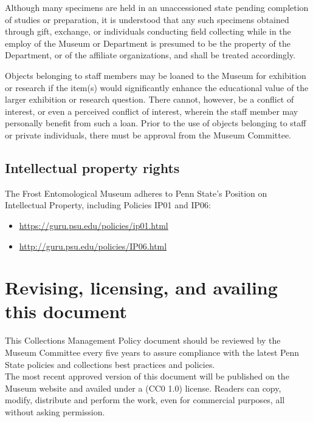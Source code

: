 \documentclass[letterpaper, 11pt]{article}
\begin{document}
\noindent{}Although many specimens are held in an unaccessioned state pending completion of studies or preparation, it is understood that any such specimens obtained through gift, exchange, or individuals conducting field collecting while in the employ of the Museum or Department is presumed to be the property of the Department, or of the affiliate organizations, and shall be treated accordingly.

\noindent{}Objects belonging to staff members may be loaned to the Museum for exhibition or research if the item(s) would significantly enhance the educational value of the larger exhibition or research question. There cannot, however, be a conflict of interest, or even a perceived conflict of interest, wherein the staff member may personally benefit from such a loan. Prior to the use of objects belonging to staff or private individuals, there must be approval from the Museum Committee.

\subsection{Intellectual property rights}
The Frost Entomological Museum adheres to Penn State's Position on Intellectual Property\citep{PSUintellectual}, including Policies IP01 and IP06:
\begin{itemize}
\item \url{https://guru.psu.edu/policies/ip01.html}
\item \url{http://guru.psu.edu/policies/IP06.html}
\end{itemize}

\clearpage
\section{Revising, licensing, and availing this document}
This Collections Management Policy document should be reviewed by the Museum Committee every five years to assure compliance with the latest Penn State policies and collections best practices and policies.\\

\noindent{}The most recent approved version of this document will be published on the Museum website and availed under a (CC0 1.0) license. Readers can copy, modify, distribute and perform the work, even for commercial purposes, all without asking permission.

\clearpage
\end{document}
